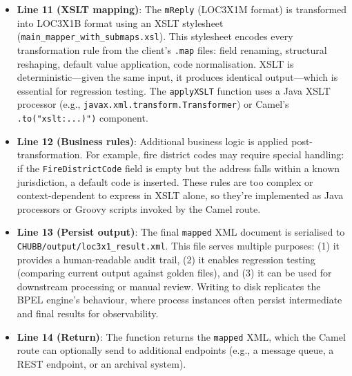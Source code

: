 \documentclass[11pt]{article}
\begin{document}
\begin{itemize}
  \item \textbf{Line 11 (XSLT mapping)}: The \texttt{mReply} (LOC3X1M format) is transformed into LOC3X1B format using an XSLT stylesheet (\texttt{main\_mapper\_with\_submaps.xsl}). This stylesheet encodes every transformation rule from the client's \texttt{.map} files: field renaming, structural reshaping, default value application, code normalisation. XSLT is deterministic—given the same input, it produces identical output—which is essential for regression testing. The \texttt{applyXSLT} function uses a Java XSLT processor (e.g., \texttt{javax.xml.transform.Transformer}) or Camel's \texttt{.to("xslt:...)")} component.

  \item \textbf{Line 12 (Business rules)}: Additional business logic is applied post-transformation. For example, fire district codes may require special handling: if the \texttt{FireDistrictCode} field is empty but the address falls within a known jurisdiction, a default code is inserted. These rules are too complex or context-dependent to express in XSLT alone, so they're implemented as Java processors or Groovy scripts invoked by the Camel route.

  \item \textbf{Line 13 (Persist output)}: The final \texttt{mapped} XML document is serialised to \texttt{CHUBB/output/loc3x1\_result.xml}. This file serves multiple purposes: (1) it provides a human-readable audit trail, (2) it enables regression testing (comparing current output against golden files), and (3) it can be used for downstream processing or manual review. Writing to disk replicates the BPEL engine's behaviour, where process instances often persist intermediate and final results for observability.

  \vspace{0.5em}
  \noindent{}
  \vspace{0.5em}

  \item \textbf{Line 14 (Return)}: The function returns the \texttt{mapped} XML, which the Camel route can optionally send to additional endpoints (e.g., a message queue, a REST endpoint, or an archival system).
\end{itemize}
\end{document}
